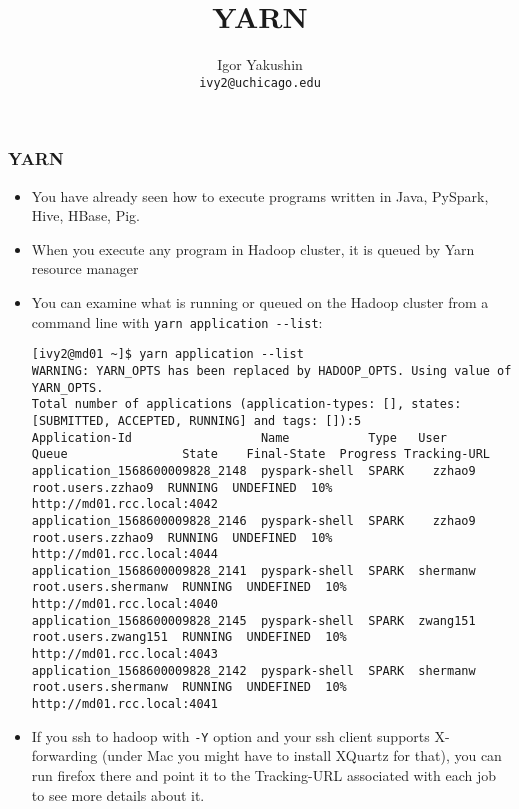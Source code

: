 \documentclass{beamer}
\title{\huge{YARN}}
\author{Igor Yakushin \\ \texttt{ivy2@uchicago.edu}}
\date{}
\begin{document}



\begin{frame}
\titlepage
\end{frame}


\begin{frame}[fragile]
  \frametitle{YARN}
  \begin{itemize}
  \item You have already seen how to execute programs written in Java, PySpark, Hive, HBase, Pig.
  \item When you execute any program in Hadoop cluster, it is queued by Yarn resource manager
  \item You can examine what is running or queued on the Hadoop cluster from a command line
    with {\color{mycolorcli}\verb|yarn application --list|}:
    {\fontsize{4}{6}

      {\color{mycolorcli}
\begin{verbatim}
[ivy2@md01 ~]$ yarn application --list
WARNING: YARN_OPTS has been replaced by HADOOP_OPTS. Using value of YARN_OPTS.
Total number of applications (application-types: [], states: [SUBMITTED, ACCEPTED, RUNNING] and tags: []):5
Application-Id                  Name           Type   User       Queue                State    Final-State  Progress Tracking-URL
application_1568600009828_2148  pyspark-shell  SPARK    zzhao9     root.users.zzhao9  RUNNING  UNDEFINED  10%  http://md01.rcc.local:4042
application_1568600009828_2146  pyspark-shell  SPARK    zzhao9     root.users.zzhao9  RUNNING  UNDEFINED  10%  http://md01.rcc.local:4044
application_1568600009828_2141  pyspark-shell  SPARK  shermanw   root.users.shermanw  RUNNING  UNDEFINED  10%  http://md01.rcc.local:4040
application_1568600009828_2145  pyspark-shell  SPARK  zwang151   root.users.zwang151  RUNNING  UNDEFINED  10%  http://md01.rcc.local:4043
application_1568600009828_2142  pyspark-shell  SPARK  shermanw   root.users.shermanw  RUNNING  UNDEFINED  10%  http://md01.rcc.local:4041
\end{verbatim}
      }
    }
  \item If you ssh to hadoop with \verb|-Y| option and your ssh client supports X-forwarding
    (under Mac you might have to install XQuartz for that),
    you can run firefox there and point it to the Tracking-URL associated with each job to see more details
    about it.
  \end{itemize}
\end{frame}
\end{document}
